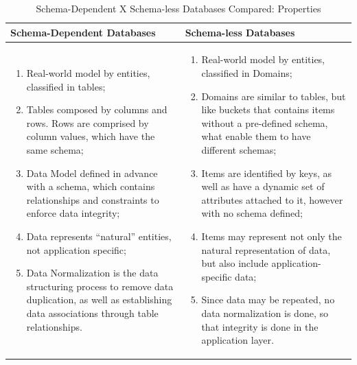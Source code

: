 \begin{table}
    \label{tab:ysi-data-distribution}
    \caption{Schema-Dependent X Schema-less Databases Compared: Properties}
    \begin{center}
    \begin{tabular}{|p{210pt}|p{210pt}|}\hline
    Schema-Dependent Databases & Schema-less Databases\\\hline
    \begin{enumerate}
      \item Real-world model by entities, classified in tables;
      \item Tables composed by columns and rows. Rows are comprised by column
      values, which have the same schema;
      \item Data Model defined in advance with a schema, which contains
      relationships and constraints to enforce data integrity;
      \item Data represents ``natural'' entities, not application specific;
      \item Data Normalization is the data structuring process to remove data
      duplication, as well as establishing data associations through table
      relationships.
    \end{enumerate} 
    & 
    \begin{enumerate}
      \item Real-world model by entities, classified in Domains;
      \item Domains are similar to tables, but like buckets that contains items
      without a pre-defined schema, what enable them to have different schemas;
      \item Items are identified by keys, as well as have a dynamic set of
      attributes attached to it, however with no schema defined;
      \item Items may represent not only the natural representation of data, but
      also include application-specific data;
      \item Since data may be repeated, no data normalization is done, so that
      integrity is done in the application layer.
    \end{enumerate}
    \\\hline
    \end{tabular}
    \end{center}
\end{table}


